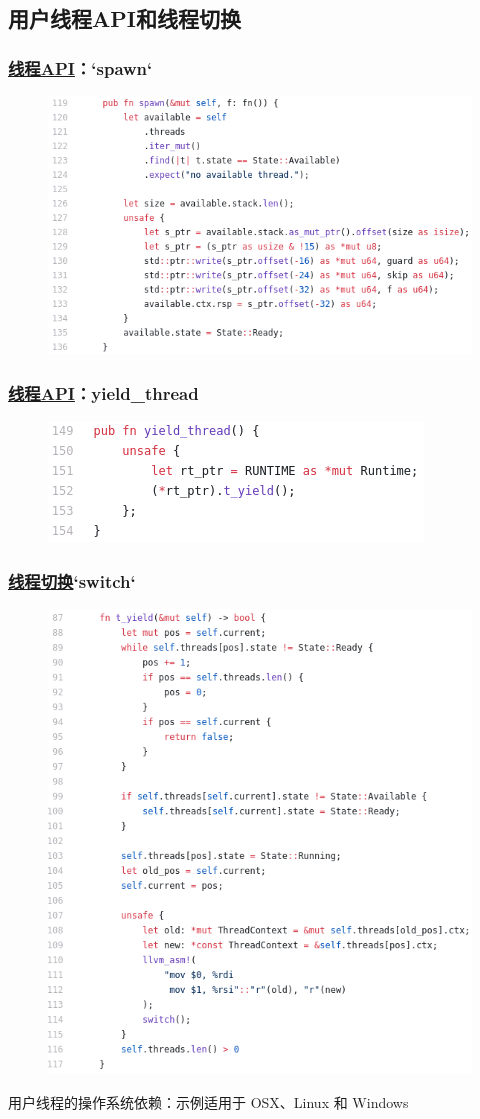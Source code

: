 \subsection{用户线程API和线程切换}
\begin{frame}[fragile]
    \frametitle{\href{https://github.com/cfsamson/example-greenthreads/blob/master/src/main.rs\#L119}{线程API}：`spawn`}
% 
	\begin{figure}
		\centering
		\includegraphics[width=0.8\linewidth]{figs/spawn.png}
	\end{figure}


% 
\end{frame}
\begin{frame}[fragile]
    \frametitle{\href{https://github.com/cfsamson/example-greenthreads/blob/master/src/main.rs\#L119}{线程API}：yield\_thread}
% 
	\begin{figure}
		\centering
		\includegraphics[width=0.7\linewidth]{figs/yield_thread.png}
	\end{figure}


% 
\end{frame}
\begin{frame}[fragile]
    \frametitle{\href{https://github.com/cfsamson/example-greenthreads/blob/master/src/main.rs\#L158}{线程切换}`switch`}
% 
	\begin{figure}
		\centering
		\includegraphics[width=0.35\linewidth]{figs/t_yield.png}
	\end{figure}


% 
用户线程的操作系统依赖：示例适用于 OSX、Linux 和 Windows
\end{frame}

